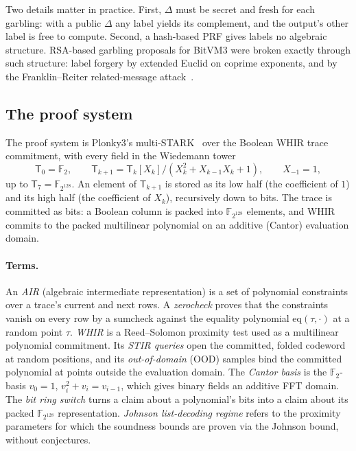\documentclass[11pt]{article}
\newcommand{\F}{\mathbb{F}_{2^{128}}}
\newcommand{\T}{\mathsf{T}}
\begin{document}
Two details matter in practice. First, $\Delta$ must be secret and fresh for
each garbling: with a public $\Delta$ any label yields its complement, and the
output's other label is free to compute. Second, a hash-based PRF gives labels
no algebraic structure. RSA-based garbling proposals for BitVM3 were broken
exactly through such structure: label forgery by extended Euclid on coprime
exponents, and by the Franklin--Reiter related-message
attack~\cite{flb25}.

\subsection{The proof system}

The proof system is Plonky3's multi-STARK~\cite{plonky3} over the Boolean WHIR
trace commitment, with every field in the Wiedemann tower
\[
  \T_0=\mathbb{F}_2,\qquad \T_{k+1}=\T_k[X_k]/(X_k^2+X_{k-1}X_k+1),\qquad X_{-1}=1 ,
\]
up to $\T_7=\F$. An element of $\T_{k+1}$ is stored as its low half (the
coefficient of $1$) and its high half (the coefficient of $X_k$), recursively
down to bits. The trace is committed as bits: a Boolean column is packed into
$\F$ elements, and WHIR commits to the packed multilinear polynomial on an
additive (Cantor) evaluation domain.

\paragraph{Terms.} An \emph{AIR} (algebraic intermediate representation) is a
set of polynomial constraints over a trace's current and next rows. A
\emph{zerocheck} proves that the constraints vanish on every row by a sumcheck
against the equality polynomial $\mathrm{eq}(\tau,\cdot)$ at a random point
$\tau$. \emph{WHIR} is a Reed--Solomon proximity test used as a multilinear
polynomial commitment. Its \emph{STIR queries} open the committed, folded
codeword at random positions, and its \emph{out-of-domain} (OOD) samples bind the
committed polynomial at points outside the evaluation domain. The \emph{Cantor
basis} is the $\mathbb{F}_2$-basis $v_0=1$, $v_i^2+v_i=v_{i-1}$, which gives
binary fields an additive FFT domain. The \emph{bit ring switch} turns a claim
about a polynomial's bits into a claim about its packed $\F$ representation.
\emph{Johnson list-decoding regime} refers to the proximity parameters for which
the soundness bounds are proven via the Johnson bound, without conjectures.
\end{document}
